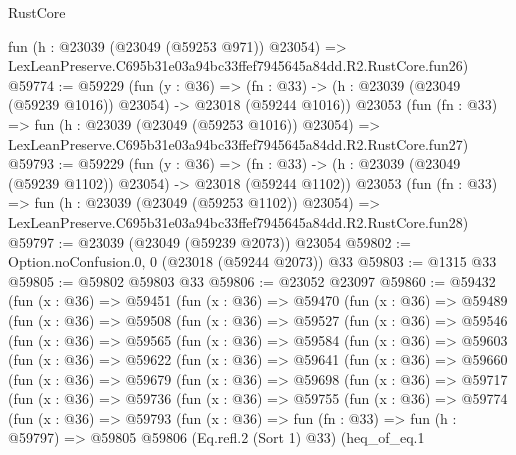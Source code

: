 \begin{lexlean}{RustCore}
\begin{coremodule}
    fun (h : @23039 (@23049 (@59253 @971)) @23054) =>
    LexLeanPreserve.C695b31e03a94bc33ffef7945645a84dd.R2.RustCore.fun26)
@59774 := @59229
    (fun (y : @36) =>
    (fn : @33) -> (h : @23039 (@23049 (@59239 @1016)) @23054) -> @23018 (@59244 @1016))
    @23053
    (fun (fn : @33) =>
    fun (h : @23039 (@23049 (@59253 @1016)) @23054) =>
    LexLeanPreserve.C695b31e03a94bc33ffef7945645a84dd.R2.RustCore.fun27)
@59793 := @59229
    (fun (y : @36) =>
    (fn : @33) -> (h : @23039 (@23049 (@59239 @1102)) @23054) -> @23018 (@59244 @1102))
    @23053
    (fun (fn : @33) =>
    fun (h : @23039 (@23049 (@59253 @1102)) @23054) =>
    LexLeanPreserve.C695b31e03a94bc33ffef7945645a84dd.R2.RustCore.fun28)
@59797 := @23039 (@23049 (@59239 @2073)) @23054
@59802 := Option.noConfusion.{0, 0} (@23018 (@59244 @2073)) @33
@59803 := @1315 @33
@59805 := @59802 @59803 @33
@59806 := @23052 @23097
@59860 := @59432
    (fun (x : @36) =>
    @59451
      (fun (x : @36) =>
      @59470
        (fun (x : @36) =>
        @59489
          (fun (x : @36) =>
          @59508
            (fun (x : @36) =>
            @59527
              (fun (x : @36) =>
              @59546
                (fun (x : @36) =>
                @59565
                  (fun (x : @36) =>
                  @59584
                    (fun (x : @36) =>
                    @59603
                      (fun (x : @36) =>
                      @59622
                        (fun (x : @36) =>
                        @59641
                          (fun (x : @36) =>
                          @59660
                            (fun (x : @36) =>
                            @59679
                              (fun (x : @36) =>
                              @59698
                                (fun (x : @36) =>
                                @59717
                                  (fun (x : @36) =>
                                  @59736
                                    (fun (x : @36) =>
                                    @59755
                                      (fun (x : @36) =>
                                      @59774
                                        (fun (x : @36) =>
                                        @59793
                                          (fun (x : @36) =>
                                          fun (fn : @33) =>
                                          fun (h : @59797) =>
                                          @59805
                                            @59806
                                            (Eq.refl.{2} (Sort 1) @33)
                                            (heq_of_eq.{1}

\end{coremodule}
\end{lexlean}
